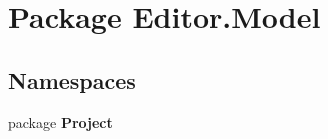 \section{Package Editor.\-Model}
\label{namespace_editor_1_1_model}
\subsection*{Namespaces}
\begin{DoxyCompactItemize}
\item 
package {\bf Project}
\end{DoxyCompactItemize}
